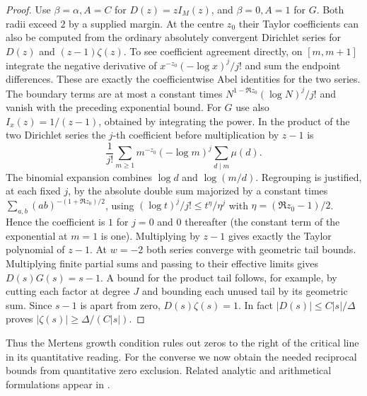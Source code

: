 \begin{proof}
Use $\beta=\alpha,A=C$ for $D(z)=zI_M(z)$, and $\beta=0,A=1$ for $G$. Both radii exceed $2$ by a supplied margin. At the centre $z_0$ their Taylor coefficients can also be computed from the ordinary absolutely convergent Dirichlet series for $D(z)$ and $(z-1)\zeta(z)$. To see coefficient agreement directly, on $[m,m+1]$ integrate the negative derivative of $x^{-z_0}(-\log x)^j/j!$ and sum the endpoint differences. These are exactly the coefficientwise Abel identities for the two series. The boundary terms are at most a constant times $N^{1-\Re z_0}(\log N)^j/j!$ and vanish with the preceding exponential bound. For $G$ use also $I_x(z)=1/(z-1)$, obtained by integrating the power. In the product of the two Dirichlet series the $j$-th coefficient before multiplication by $z-1$ is
\[
 \frac1{j!}\sum_{m\ge1}m^{-z_0}(-\log m)^j\sum_{d\mid m}\mu(d).
\]
The binomial expansion combines $\log d$ and $\log(m/d)$. Regrouping is justified, at each fixed $j$, by the absolute double sum majorized by a constant times $\sum_{a,b}(ab)^{-(1+\Re z_0)/2}$, using $(\log t)^j/j!\le t^\eta/\eta^j$ with $\eta=(\Re z_0-1)/2$. Hence the coefficient is $1$ for $j=0$ and $0$ thereafter (the constant term of the exponential at $m=1$ is one). Multiplying by $z-1$ gives exactly the Taylor polynomial of $z-1$. At $w=-2$ both series converge with geometric tail bounds. Multiplying finite partial sums and passing to their effective limits gives $D(s)G(s)=s-1$. A bound for the product tail follows, for example, by cutting each factor at degree $J$ and bounding each unused tail by its geometric sum. Since $s-1$ is apart from zero, $D(s)\zeta(s)=1$. In fact $|D(s)|\le C|s|/\Delta$ proves $|\zeta(s)|\ge\Delta/(C|s|)$.
\end{proof}

Thus the Mertens growth condition rules out zeros to the right of the critical line in its quantitative reading. For the converse we now obtain the needed reciprocal bounds from quantitative zero exclusion. Related analytic and arithmetical formulations appear in \cite{ng,rhpacket}.
